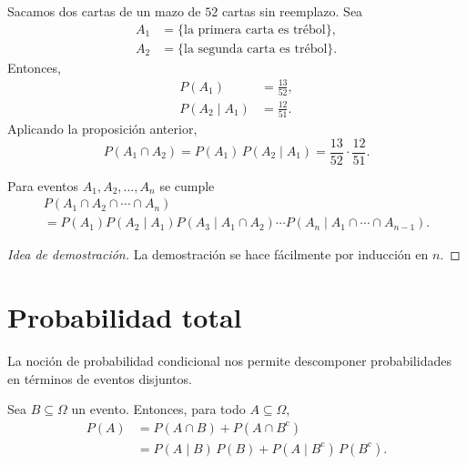 \begin{example}
    Sacamos dos cartas de un mazo de $52$ cartas sin reemplazo. Sea
    \begin{align*}
        A_1 &= \{\text{la primera carta es trébol}\}, \\
        A_2 &= \{\text{la segunda carta es trébol}\}.
    \end{align*}
    Entonces,
    \begin{align*}
        P(A_1) &= \frac{13}{52}, \\
        P(A_2 \mid A_1) &= \frac{12}{51}.
    \end{align*}
    Aplicando la proposición anterior,
    \begin{equation*}
        P(A_1 \cap A_2) = P(A_1)\,P(A_2 \mid A_1) = \frac{13}{52} \cdot \frac{12}{51}.
    \end{equation*}
\end{example}

\begin{proposition}
    Para eventos $A_1, A_2, \dots, A_n$ se cumple
    \begin{multline*}
        P(A_1 \cap A_2 \cap \cdots \cap A_n)
        \\= P(A_1) P(A_2 \mid A_1) P(A_3 \mid A_1 \cap A_2) \cdots P(A_n \mid A_1 \cap \cdots \cap A_{n-1}).
    \end{multline*}
\end{proposition}

\begin{proof}[Idea de demostración]
    La demostración se hace fácilmente por inducción en $n$.
\end{proof}

\section{Probabilidad total}

La noción de probabilidad condicional nos permite descomponer probabilidades en términos de eventos disjuntos.

\begin{proposition}
    Sea $B \subseteq \Omega$ un evento. Entonces, para todo $A \subseteq \Omega$,
    \begin{align*}
        P(A) &= P(A \cap B) + P(A \cap B^{\mathrm c}) \\
             &= P(A \mid B)\,P(B) + P(A \mid B^{\mathrm c})\,P(B^{\mathrm c}).
    \end{align*}
\end{proposition}

